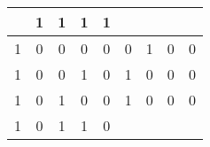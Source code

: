 \begin{tabular}{|c|c|c|c||c|c|c|c|c|}
    
    
    & 1
  
    
    
    & 1
  
    
    
    & 1
  
    
    
    & 1
   \\
  \hline

  
  
  1 & 0 & 0 & 0
  
    
    
    & 0
  
    
    
    & 0
  
    
    
    & 1
  
    
    
    & 0
  
    
    
    & 0
   \\
  

  
  
  1 & 0 & 0 & 1
  
    
    
    & 0
  
    
    
    & 1
  
    
    
    & 0
  
    
    
    & 0
  
    
    
    & 0
   \\
  

  
  
  1 & 0 & 1 & 0
  
    
    
    & 0
  
    
    
    & 1
  
    
    
    & 0
  
    
    
    & 0
  
    
    
    & 0
   \\
  

  
  
  1 & 0 & 1 & 1
  
    
    
    & 0
  

\end{tabular}
